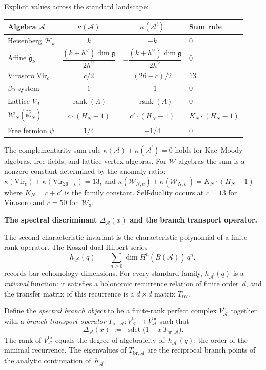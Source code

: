 \documentclass[11pt]{report}
\theoremstyle{definition}
\theoremstyle{remark}
\providecommand{\cA}{\mathcal{A}}
\providecommand{\cH}{\mathcal{H}}
\providecommand{\barB}{\bar{B}}
\providecommand{\fg}{\mathfrak{g}}
\numberwithin{equation}{section}
\begin{document}
Explicit values across the standard landscape:
\begin{center}
\renewcommand{\arraystretch}{1.2}
\begin{tabular}{lccl}
\textbf{Algebra $\cA$}
 & $\kappa(\cA)$
 & $\kappa(\cA^!)$
 & \textbf{Sum rule}\\
\hline
Heisenberg $\cH_k$ & $k$ & $-k$ & $0$\\[2pt]
Affine $\widehat{\fg}_k$
 & $\dfrac{(k+h^\vee)\dim\fg}{2h^\vee}$
 & $-\dfrac{(k+h^\vee)\dim\fg}{2h^\vee}$ & $0$\\[6pt]
Virasoro $\mathrm{Vir}_c$ & $c/2$ & $(26-c)/2$ & $13$\\[2pt]
$\beta\gamma$ system & $1$ & $-1$ & $0$\\[2pt]
Lattice $V_\Lambda$ & $\operatorname{rank}(\Lambda)$
 & $-\operatorname{rank}(\Lambda)$ & $0$\\[2pt]
$\mathcal W_N(\widehat{\mathfrak{sl}}_N)$
 & $c\cdot(H_N{-}1)$
 & $c'\cdot(H_N{-}1)$
 & $K_N\cdot(H_N{-}1)$\\[6pt]
Free fermion $\psi$ & $1/4$ & $-1/4$ & $0$
\end{tabular}
\end{center}
The complementarity sum rule $\kappa(\cA)+\kappa(\cA^!)=0$ holds for
Kac--Moody algebras, free fields, and lattice vertex algebras.
For $\mathcal W$-algebras the sum is a nonzero constant
determined by the anomaly ratio: $\kappa(\mathrm{Vir}_c)+
\kappa(\mathrm{Vir}_{26-c})=13$, and
$\kappa(\mathcal W_{N,c})+\kappa(\mathcal W_{N,c'})
=K_N\cdot(H_N{-}1)$ where $K_N=c+c'$ is the family constant.
Self-duality occurs at $c=13$ for Virasoro and
$c=50$ for~$\mathcal W_3$.

\medskip

\noindent\textbf{The spectral discriminant $\Delta_\cA(x)$
and the branch transport operator.}

The second characteristic invariant is the
characteristic polynomial of a finite-rank operator. The Koszul dual Hilbert series
\[
h_{\cA^!}(q)
\;=\;
\sum_{n\ge 0}\dim H^n(\barB(\cA))\,q^n,
\]
records bar cohomology dimensions. For every standard family, $h_{\cA^!}(q)$ is a
\emph{rational} function: it satisfies a holonomic recurrence relation
of finite order~$d$, and the transfer matrix of this recurrence is
a $d\times d$ matrix $T_{\mathrm{rec}}$.

Define the \emph{spectral branch object} to be a finite-rank perfect
complex $V^{\mathrm{br}}_\cA$ together with a \emph{branch transport
operator} $T_{\mathrm{br},\cA}\colon
V^{\mathrm{br}}_\cA\to V^{\mathrm{br}}_\cA$ such that
\begin{equation}\label{eq:pref-delta-def}
\Delta_\cA(x)
\;:=\;
\operatorname{sdet}\!\bigl(1-x\,T_{\mathrm{br},\cA}\bigr).
\end{equation}
The rank of $V^{\mathrm{br}}_\cA$ equals the degree of algebraicity
of~$h_{\cA^!}(q)$: the order of the minimal recurrence. The
eigenvalues of $T_{\mathrm{br},\cA}$ are the reciprocal branch
points of the analytic continuation of~$h_{\cA^!}$.
\end{document}
